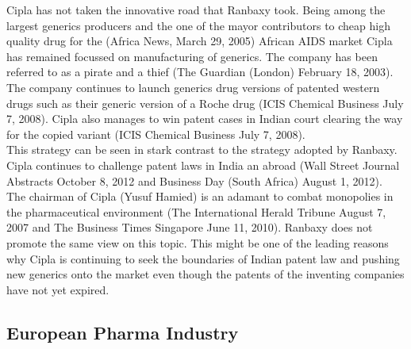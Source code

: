 Cipla has not taken the innovative road that Ranbaxy took.
Being among the largest generics producers and the one of the mayor contributors to cheap high quality drug for the (Africa News, March 29, 2005) African AIDS market Cipla has remained focussed on manufacturing of generics.
The company has been referred to as a pirate and a thief (The Guardian (London) February 18, 2003).
The company continues to launch generics drug versions of patented western drugs such as their generic version of a Roche drug (ICIS Chemical Business July 7, 2008).  
Cipla also manages to win patent cases in Indian court clearing the way for the copied variant (ICIS Chemical Business July 7, 2008).\\
This strategy can be seen in stark contrast to the strategy adopted by Ranbaxy. Cipla continues to challenge patent laws in India an abroad (Wall Street Journal Abstracts October 8, 2012 and Business Day (South Africa) August 1, 2012).\\
The chairman of Cipla (Yusuf Hamied) is an adamant to combat monopolies in the  pharmaceutical environment (The International Herald Tribune August 7, 2007 and The Business Times Singapore June 11, 2010).
Ranbaxy does not promote the same view on this topic.
This might be one of the leading reasons why Cipla is continuing to seek the boundaries of Indian patent law and pushing new generics onto the market even though the patents of the inventing companies have not yet expired.

\subsection{European Pharma Industry}

